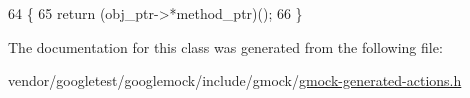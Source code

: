 \begin{DoxyCode}
64                                                \{
65            \textcolor{keywordflow}{return} (obj\_ptr->*method\_ptr)();
66   \}
\end{DoxyCode}


The documentation for this class was generated from the following file\+:\begin{DoxyCompactItemize}
\item 
vendor/googletest/googlemock/include/gmock/\hyperlink{gmock-generated-actions_8h}{gmock-\/generated-\/actions.\+h}\end{DoxyCompactItemize}
